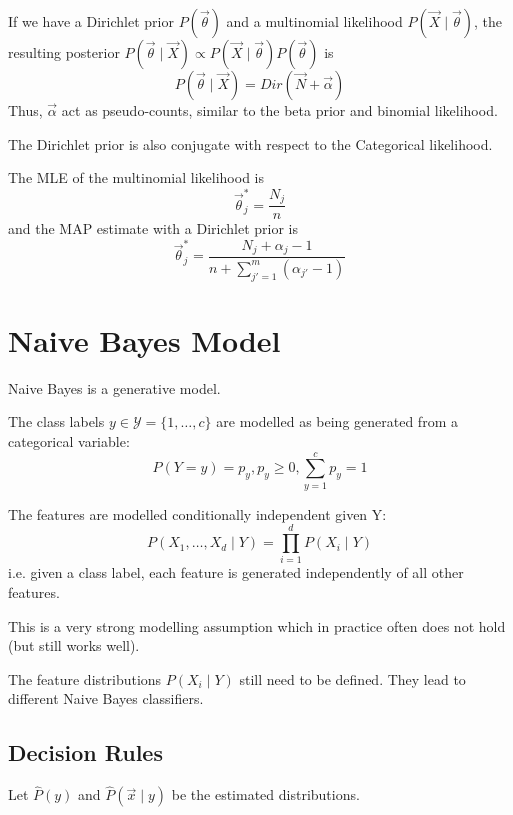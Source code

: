 If we have a Dirichlet prior $P(\vec{\theta})$
and a multinomial likelihood $P(\vec{X} \mid \vec{\theta})$,
the resulting posterior $P(\vec{\theta} \mid \vec{X}) \propto P(\vec{X} \mid \vec{\theta}) P(\vec{\theta})$
is
\begin{equation*}
P(\vec{\theta} \mid \vec{X}) = Dir(\vec{N} + \vec{\alpha})
\end{equation*}
Thus, $\vec{\alpha}$ act as pseudo-counts,
similar to the beta prior and binomial likelihood.

The Dirichlet prior is also conjugate with respect
to the Categorical likelihood.

The MLE of the multinomial likelihood is
\begin{equation*}
\vec{\theta}_j^* = \frac{N_j}{n}
\end{equation*}
and the MAP estimate with a Dirichlet prior is
\begin{equation*}
\vec{\theta}_j^* = \frac{N_j + \alpha_j - 1}{n + \sum_{j' = 1}^m{(\alpha_{j'} - 1)}}
\end{equation*}


\section{Naive Bayes Model}
Naive Bayes is a generative model.

The class labels
$y \in \mathcal{Y} = \{1, \dotsc, c\}$
are modelled as being generated
from a categorical variable:
\begin{equation*}
P(Y = y) = p_y, p_y \geq 0, \sum_{y=1}^c{p_y} = 1
\end{equation*}

The features are modelled conditionally
independent given Y:
\begin{equation*}
P(X_1, \dotsc, X_d \mid Y)
= \prod_{i=1}^d{P(X_i \mid Y)}
\end{equation*}
i.e. given a class label,
each feature is generated independently
of all other features.

This is a very strong modelling assumption
which in practice often does not hold
(but still works well).

The feature distributions $P(X_i \mid Y)$
still need to be defined.
They lead to different Naive Bayes classifiers.


\subsection{Decision Rules}
Let $\hat{P}(y)$ and
$\hat{P}(\vec{x} \mid y)$
be the estimated distributions.

